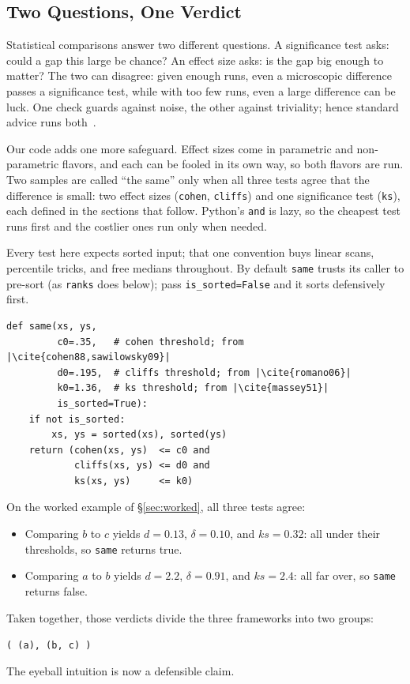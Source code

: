 \subsection{Two Questions, One Verdict}

Statistical comparisons answer two different questions.
A significance test asks: could a gap this large be chance?
An effect size asks: is the gap big enough to matter?
The two can disagree: given enough runs, even a microscopic
difference passes a significance test, while with too few runs,
even a large difference can be luck.
One check guards against noise, the other against triviality;
hence standard advice runs both~\cite{arcuri11}.

Our code adds one more safeguard.
Effect sizes come in parametric and non-parametric flavors, and
each can be fooled in its own way, so both flavors are run.
Two samples are called ``the same'' only when all three tests
agree that the difference is small: two effect sizes
(\texttt{cohen}, \texttt{cliffs}) and one significance test
(\texttt{ks}), each defined in the sections that follow.
Python's \texttt{and} is lazy, so the cheapest test runs first
and the costlier ones run only when needed.

Every test here expects sorted input; that one convention buys
linear scans, percentile tricks, and free medians throughout.
By default \texttt{same} trusts its caller to pre-sort (as
\texttt{ranks} does below); pass \texttt{is\_sorted=False}
and it sorts defensively first.

\begin{lstlisting}[style=py]
def same(xs, ys,
         c0=.35,   # cohen threshold; from |\cite{cohen88,sawilowsky09}|
         d0=.195,  # cliffs threshold; from |\cite{romano06}|
         k0=1.36,  # ks threshold; from |\cite{massey51}|
         is_sorted=True):
    if not is_sorted:
        xs, ys = sorted(xs), sorted(ys)
    return (cohen(xs, ys)  <= c0 and
            cliffs(xs, ys) <= d0 and
            ks(xs, ys)     <= k0)
\end{lstlisting}

On the worked example of \S\ref{sec:worked}, all three tests
agree:
\begin{itemize}
	\item
Comparing $b$ to $c$ yields $d\!=\!0.13$, $\delta\!=\!0.10$,
and $\mathit{ks}\!=\!0.32$: all under their thresholds, so
\texttt{same} returns true.
\item
Comparing $a$ to $b$ yields $d\!=\!2.2$, $\delta\!=\!0.91$, and
$\mathit{ks}\!=\!2.4$: all far over, so \texttt{same} returns
false.
\end{itemize}
Taken together, those verdicts divide the three frameworks into
two groups:
\begin{center}
\texttt{( (a), (b, c) )}
\end{center}
The eyeball intuition is now a defensible claim.

